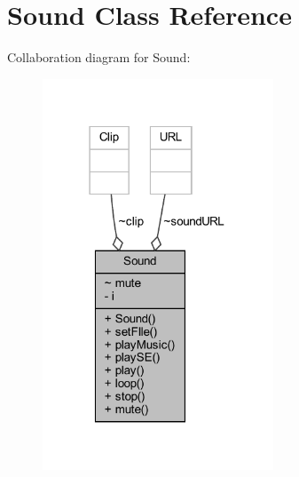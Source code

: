 \hypertarget{classprogetto_1_1_sound}{}\section{Sound Class Reference}
\label{classprogetto_1_1_sound}


Collaboration diagram for Sound\+:\nopagebreak
\begin{figure}[H]
\begin{center}
\leavevmode
\includegraphics[width=195pt]{classprogetto_1_1_sound__coll__graph}
\end{center}
\end{figure}
